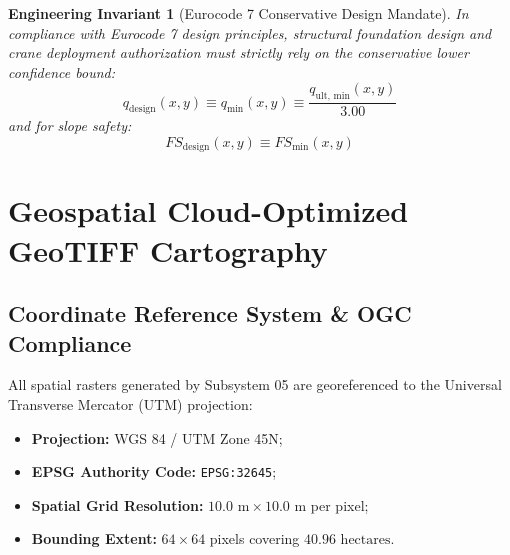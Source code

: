 \documentclass[11pt,a4paper]{article}
\newtheorem{invariant}{Engineering Invariant}[section]
\theoremstyle{definition}
\theoremstyle{remark}
\begin{document}
\begin{invariant}[Eurocode 7 Conservative Design Mandate]
    In compliance with Eurocode 7 design principles, structural foundation design and crane deployment authorization must strictly rely on the conservative lower confidence bound:
    \begin{equation}
        q_{\text{design}}(x, y) \equiv q_{\min}(x, y) \equiv \frac{q_{\text{ult, min}}(x, y)}{3.00}
    \end{equation}
    and for slope safety:
    \begin{equation}
        FS_{\text{design}}(x, y) \equiv FS_{\min}(x, y)
    \end{equation}
\end{invariant}


\section{Geospatial Cloud-Optimized GeoTIFF Cartography}

\subsection{Coordinate Reference System \& OGC Compliance}
All spatial rasters generated by Subsystem 05 are georeferenced to the Universal Transverse Mercator (UTM) projection:
\begin{itemize}
    \item \textbf{Projection:} WGS 84 / UTM Zone 45N;
    \item \textbf{EPSG Authority Code:} \texttt{EPSG:32645};
    \item \textbf{Spatial Grid Resolution:} $10.0\text{ m} \times 10.0\text{ m}$ per pixel;
    \item \textbf{Bounding Extent:} $64 \times 64$ pixels covering $40.96\text{ hectares}$.
\end{itemize}
\end{document}
